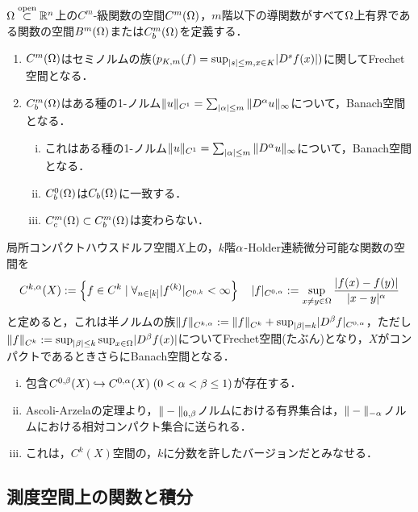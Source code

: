 \documentclass[uplatex,dvipdfmx]{jsreport}
\begin{document}
\begin{example}[導関数ノルムを備えたBanach空間]\label{exp-Banach-space-with-derivative-norm}
    $\Omega\overset{\mathrm{open}}{\subset}\mathbb{R}^n$上の$C^m$-級関数の空間$C^m(\Omega)$，$m$階以下の導関数がすべて$\Omega$上有界である関数の空間$B^m(\Omega)$または$C_b^m(\Omega)$を定義する．
    \begin{enumerate}
        \item $C^m(\Omega)$はセミノルムの族$(p_{K,m}(f)=\sup_{\lvert s\rvert\le m,x\in K}\lvert D^sf(x)\rvert)$に関してFrechet空間となる．
        \item $C^m_b(\Omega)$はある種の1-ノルム$\|u\|_{C^1}=\sum_{\lvert\alpha\rvert\le m}\|D^\alpha u\|_\infty$について，Banach空間となる．
        \begin{enumerate}[(i)]
            \item これはある種の1-ノルム$\|u\|_{C^1}=\sum_{\lvert\alpha\rvert\le m}\|D^\alpha u\|_\infty$について，Banach空間となる．
            \item $C_b^0(\Omega)$は$C_b(\Omega)$に一致する．
            \item $C_c^m(\Omega)\subset C_b^m(\Omega)$は変わらない．
        \end{enumerate}
    \end{enumerate}
\end{example}

\begin{example}[Holder空間]
    局所コンパクトハウスドルフ空間$X$上の，$k$階$\alpha$-Holder連続微分可能な関数の空間を
    \[C^{k,\alpha}(X):=\left\{f\in C^k\mid\forall_{n\in[k]}\lvert f^{(k)}\rvert_{C^{0,k}}<\infty\right\}\quad\lvert f\rvert_{C^{0,\alpha}}:=\sup_{x\ne y\in\Omega}\frac{\lvert f(x)-f(y)\rvert}{\lvert x-y\rvert^\alpha}\]
    と定めると，これは半ノルムの族$\|f\|_{C^{k,\alpha}}:=\|f\|_{C^k}+\sup_{\lvert\beta\rvert=k}\lvert D^\beta f\rvert_{C^{0,\alpha}}$，ただし$\|f\|_{C^k}:=\sup_{\lvert\beta\rvert\le k}\sup_{x\in\Omega}\lvert D^\beta f(x)\rvert$についてFrechet空間(たぶん)となり，$X$がコンパクトであるときさらにBanach空間となる．
    \begin{enumerate}[(i)]
        \item 包含$C^{0,\beta}(X)\hookrightarrow C^{0,\alpha}(X)\;(0<\alpha<\beta\le 1)$が存在する．
        \item Ascoli-Arzelaの定理より，$\|-\|_{0,\beta}$ノルムにおける有界集合は，$\|-\|_{-\alpha}$ノルムにおける相対コンパクト集合に送られる．
        \item これは，$C^k(X)$空間の，$k$に分数を許したバージョンだとみなせる．
    \end{enumerate}
\end{example}

\subsection{測度空間上の関数と積分}
\end{document}

